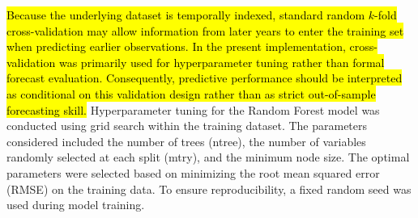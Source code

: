 \documentclass[10pt,letterpaper]{article}
\begin{document}
\hl{Because the underlying dataset is temporally indexed, standard random $k$-fold cross-validation may allow information from later years to enter the training set when predicting earlier observations. In the present implementation, cross-validation was primarily used for hyperparameter tuning rather than formal forecast evaluation. Consequently, predictive performance should be interpreted as conditional on this validation design rather than as strict out-of-sample forecasting skill.}
Hyperparameter tuning for the Random Forest model was conducted using grid search within the training dataset. The parameters considered included the number of trees (ntree), the number of variables randomly selected at each split (mtry), and the minimum node size. The optimal parameters were selected based on minimizing the root mean squared error (RMSE) on the training data. To ensure reproducibility, a fixed random seed was used during model training.




%
%
\end{document}
